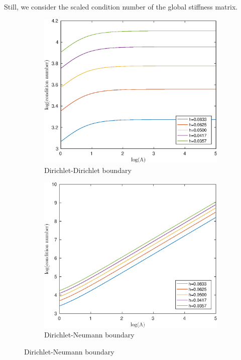 \documentclass[12pt]{article}
\begin{document}
Still, we consider the scaled condition number of the global stiffness matrix.
\pagebreak
\begin{figure}[h!]
\centering
\begin{subfigure}{0.4\textwidth}
\includegraphics[width=\textwidth]{cond-A-2D-plinear-DD}
\caption{Dirichlet-Dirichlet boundary}
\end{subfigure}
\hfill
\begin{subfigure}{0.4\textwidth}
\includegraphics[width=\textwidth]{cond-A-2D-plinear-DN}
\caption{Dirichlet-Neumann boundary}

\end{subfigure}
\end{figure}
\end{document}
